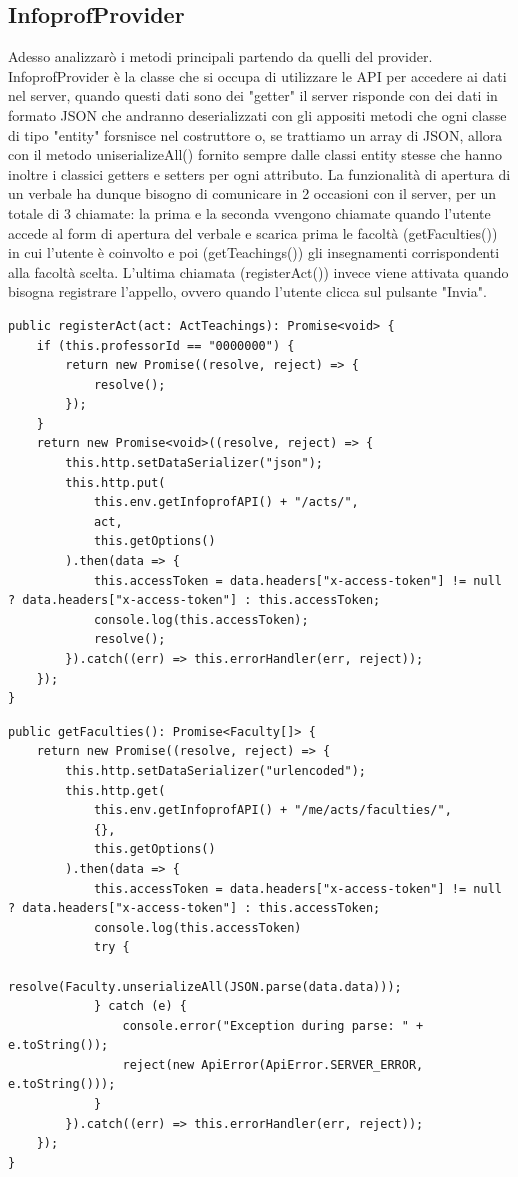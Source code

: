 \documentclass[Lau, oneside, noexaminfo]{sapthesis}%
\begin{document}
\subsection{InfoprofProvider}
Adesso analizzarò i metodi principali partendo da quelli del provider. InfoprofProvider è la classe che si occupa di utilizzare le API per accedere ai dati nel server, quando questi dati sono dei "getter" il server risponde con dei dati in formato JSON che andranno deserializzati con gli appositi metodi che ogni classe di tipo "entity" forsnisce nel costruttore o, se trattiamo un array di JSON, allora con il metodo uniserializeAll() fornito sempre dalle classi entity stesse che hanno inoltre i classici getters e setters per ogni attributo. La funzionalità di apertura di un verbale ha dunque bisogno di comunicare in 2 occasioni con il server, per un totale di 3 chiamate: la prima e la seconda vvengono chiamate quando l'utente accede al form di apertura del verbale e scarica prima le facoltà (getFaculties()) in cui l'utente è coinvolto e poi (getTeachings()) gli insegnamenti corrispondenti alla facoltà scelta. L'ultima chiamata (registerAct()) invece viene attivata quando bisogna registrare l'appello, ovvero quando l'utente clicca sul pulsante "Invia".

\begin{lstlisting}
public registerAct(act: ActTeachings): Promise<void> {
	if (this.professorId == "0000000") {
		return new Promise((resolve, reject) => {
			resolve();
		});
	}
	return new Promise<void>((resolve, reject) => {
		this.http.setDataSerializer("json");
		this.http.put(
			this.env.getInfoprofAPI() + "/acts/",
			act,
			this.getOptions()
		).then(data => {
			this.accessToken = data.headers["x-access-token"] != null ? data.headers["x-access-token"] : this.accessToken;
			console.log(this.accessToken);
			resolve();
		}).catch((err) => this.errorHandler(err, reject));
	});
}
\end{lstlisting}

\begin{lstlisting}
public getFaculties(): Promise<Faculty[]> {
	return new Promise((resolve, reject) => {
		this.http.setDataSerializer("urlencoded");
		this.http.get(
			this.env.getInfoprofAPI() + "/me/acts/faculties/",
			{},
			this.getOptions()
		).then(data => {
			this.accessToken = data.headers["x-access-token"] != null ? data.headers["x-access-token"] : this.accessToken;
			console.log(this.accessToken)
			try {
				resolve(Faculty.unserializeAll(JSON.parse(data.data)));
			} catch (e) {
				console.error("Exception during parse: " + e.toString());
				reject(new ApiError(ApiError.SERVER_ERROR, e.toString()));
			}
		}).catch((err) => this.errorHandler(err, reject));
	});
}
\end{lstlisting}
\end{document}
